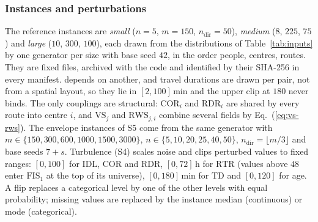 \subsubsection{Instances and perturbations}
The reference instances are \emph{small} ($n=5$, $m=150$, $n_{\mathrm{dir}}=50$),
\emph{medium} ($8$, $225$, $75$) and \emph{large} ($10$, $300$, $100$), each drawn from the
distributions of Table~\ref{tab:inputs} by one generator per size with base seed $42$, in the
order people, centres, routes. They are fixed files, archived with the code and identified by
their SHA-256 in every manifest.
depends on another, and travel durations are drawn per pair, not from a spatial layout, so
they lie in $[2,100]$\,min and the upper clip at $180$ never binds. The only couplings are
structural: $\mathrm{COR}_i$ and $\mathrm{RDR}_i$ are shared by every route into centre $i$,
and $\mathrm{VS}_j$ and $\mathrm{RWS}_{j,i}$ combine several fields by
Eq.~(\ref{eq:vs-rws}). The envelope instances of S5 come from the same generator with
$m\in\{150,300,600,1000,1500,3000\}$, $n\in\{5,10,20,25,40,50\}$,
$n_{\mathrm{dir}}=\lfloor m/3\rfloor$ and base seeds $7+s$. Turbulence (S4) scales noise
and clips perturbed values to fixed ranges: $[0,100]$ for $\mathrm{IDL}$, $\mathrm{COR}$ and
$\mathrm{RDR}$, $[0,72]$\,h for $\mathrm{RTR}$ (values above $48$ enter $\mathrm{FIS}_1$ at the
top of its universe), $[0,180]$\,min for $\mathrm{TD}$ and $[0,120]$ for age. A flip replaces
a categorical level by one of the other levels with equal probability; missing values are
replaced by the instance median (continuous) or mode (categorical).
